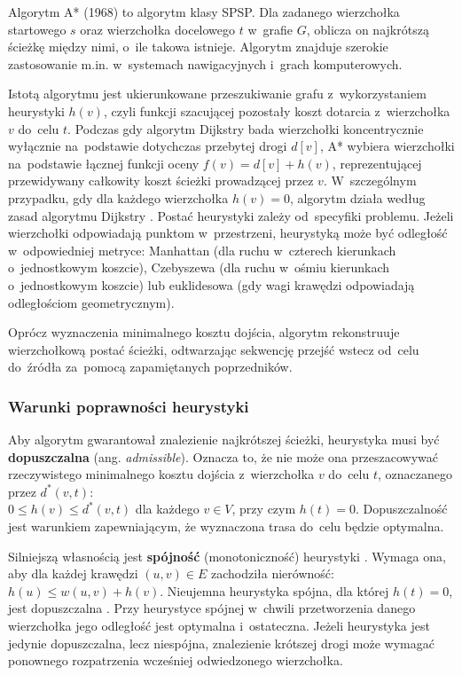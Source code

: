 \documentclass[11pt,a4paper,oneside]{report}
\begin{document}
Algorytm A* (1968) \cite{hart-1968-heuristicpath} to algorytm klasy SPSP. Dla zadanego wierzchołka startowego $s$ oraz wierzchołka docelowego $t$ w~grafie $G$, oblicza on najkrótszą ścieżkę między nimi, o~ile takowa istnieje. Algorytm znajduje szerokie zastosowanie m.in. w~systemach nawigacyjnych i~grach komputerowych.

Istotą algorytmu jest ukierunkowane przeszukiwanie grafu z~wykorzystaniem heurystyki $h(v)$, czyli funkcji szacującej pozostały koszt dotarcia z~wierzchołka $v$ do~celu $t$. Podczas gdy algorytm Dijkstry bada wierzchołki koncentrycznie wyłącznie na~podstawie dotychczas przebytej drogi $d[v]$, A* wybiera wierzchołki na~podstawie łącznej funkcji oceny $f(v) = d[v] + h(v)$, reprezentującej przewidywany całkowity koszt ścieżki prowadzącej przez $v$. W~szczególnym przypadku, gdy dla każdego wierzchołka $h(v)=0$, algorytm działa według zasad algorytmu Dijkstry \cite{mit-2026-pathsearch}. Postać heurystyki zależy od~specyfiki problemu. Jeżeli wierzchołki odpowiadają punktom w~przestrzeni, heurystyką może być odległość w~odpowiedniej metryce: Manhattan (dla ruchu w~czterech kierunkach o~jednostkowym koszcie), Czebyszewa (dla ruchu w~ośmiu kierunkach o~jednostkowym koszcie) lub euklidesowa (gdy wagi krawędzi odpowiadają odległościom geometrycznym).

Oprócz wyznaczenia minimalnego kosztu dojścia, algorytm rekonstruuje wierzchołkową postać ścieżki, odtwarzając sekwencję przejść wstecz od~celu do~źródła za~pomocą zapamiętanych poprzedników.

\subsubsection{Warunki poprawności heurystyki}

Aby algorytm gwarantował znalezienie najkrótszej ścieżki, heurystyka musi być \textbf{dopuszczalna} (ang. \textit{admissible}). Oznacza to, że nie może ona przeszacowywać rzeczywistego minimalnego kosztu dojścia z~wierzchołka $v$ do~celu $t$, oznaczanego przez $d^*(v,t)$: \\ $0 \leq h(v) \leq d^*(v,t)$ dla każdego $v \in V$, przy czym $h(t) = 0$. Dopuszczalność jest warunkiem zapewniającym, że wyznaczona trasa do~celu będzie optymalna.

Silniejszą własnością jest \textbf{spójność} (monotoniczność) heurystyki \cite{mit-2026-pathsearch}. Wymaga ona, aby dla każdej krawędzi $(u,v)\in E$ zachodziła nierówność: $h(u) \leq w(u,v) + h(v)$. Nieujemna heurystyka spójna, dla której $h(t)=0$, jest dopuszczalna \cite{stanford-2023-searchconsistency}. Przy heurystyce spójnej w~chwili przetworzenia danego wierzchołka jego odległość jest optymalna i~ostateczna. Jeżeli heurystyka jest jedynie dopuszczalna, lecz niespójna, znalezienie krótszej drogi może wymagać ponownego rozpatrzenia wcześniej odwiedzonego wierzchołka.
\end{document}

